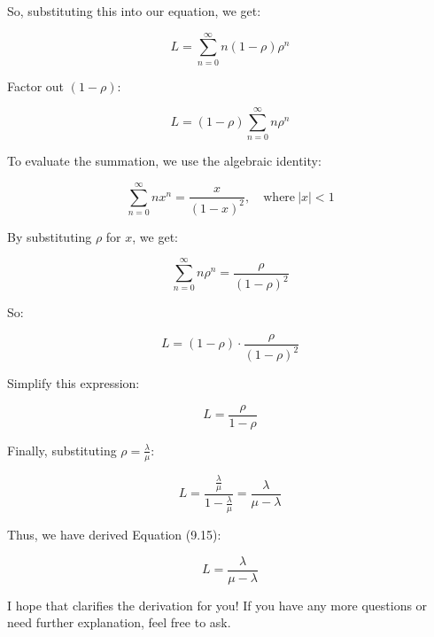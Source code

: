 So, substituting this into our equation, we get:

\[ L = \sum^{\infty}_{n=0} n (1 - \rho) \rho^{n} \]

Factor out \((1 - \rho)\):

\[ L = (1 - \rho) \sum^{\infty}_{n=0} n \rho^{n} \]

To evaluate the summation, we use the algebraic identity:

\[ \sum^{\infty}_{n=0} n x^{n} = \frac{x}{(1 - x)^{2}}, \quad \text{where} \ |x| < 1 \]

By substituting \(\rho\) for \(x\), we get:

\[ \sum^{\infty}_{n=0} n \rho^{n} = \frac{\rho}{(1 - \rho)^{2}} \]

So:

\[ L = (1 - \rho) \cdot \frac{\rho}{(1 - \rho)^{2}} \]

Simplify this expression:

\[ L = \frac{\rho}{1 - \rho} \]

Finally, substituting \(\rho = \frac{\lambda}{\mu}\):

\[ L = \frac{\frac{\lambda}{\mu}}{1 - \frac{\lambda}{\mu}} = \frac{\lambda}{\mu - \lambda} \]

Thus, we have derived Equation (9.15):

\[ L = \frac{\lambda}{\mu - \lambda} \]

I hope that clarifies the derivation for you! If you have any more questions or need further explanation, feel free to ask.